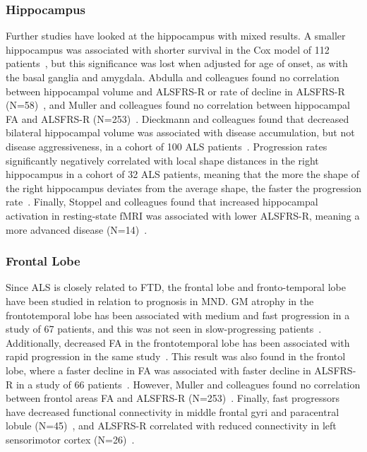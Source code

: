 \subsubsection*{Hippocampus}
Further studies have looked at the hippocampus with mixed results.
A smaller hippocampus was associated with shorter survival in the Cox model of 112 patients~\cite{westenengSubcorticalStructuresAmyotrophic2015}, but this significance was lost when adjusted for age of onset, as with the basal ganglia and amygdala.
Abdulla and colleagues found no correlation between hippocampal volume and ALSFRS-R or rate of decline in ALSFRS-R (N=58)~\cite{abdullaHippocampalDegenerationPatients2014}, and Muller and colleagues found no correlation between hippocampal FA and ALSFRS-R (N=253)~\cite{mullerLargescaleMulticentreCerebral2016}.
Dieckmann and colleagues found that decreased bilateral hippocampal volume was associated with disease accumulation, but not disease aggressiveness, in a cohort of 100 ALS patients~\cite{dieckmannCorticalSubcorticalGrey2022}.
Progression rates significantly negatively correlated with local shape distances in the right hippocampus in a cohort of 32 ALS patients, meaning that the more the shape of the right hippocampus deviates from the average shape, the faster the progression rate~\cite{taeShapeAnalysisSubcortical2020}.
Finally, Stoppel and colleagues found that increased hippocampal activation in resting-state fMRI was associated with lower ALSFRS-R, meaning a more advanced disease (N=14)~\cite{stoppelStructuralFunctionalHallmarks2014}.

\subsubsection*{Frontal Lobe}
Since ALS is closely related to FTD, the frontal lobe and fronto-temporal lobe have been studied in relation to prognosis in MND.
GM atrophy in the frontotemporal lobe has been associated with medium and fast progression in a study of 67 patients, and this was not seen in slow-progressing patients~\cite{sendaStructuralMRICorrelates2017}.
Additionally, decreased FA in the frontotemporal lobe has been associated with rapid progression in the same study~\cite{sendaStructuralMRICorrelates2017}.
This result was also found in the frontol lobe, where a faster decline in FA was associated with faster decline in ALSFRS-R in a study of 66 patients~\cite{kalraProspectiveHarmonizedMulticenter2020}.
However, Muller and colleagues found no correlation between frontol areas FA and ALSFRS-R (N=253)~\cite{mullerLargescaleMulticentreCerebral2016}.
Finally, fast progressors have decreased functional connectivity in middle frontal gyri and paracentral lobule (N=45)~\cite{trojsiRestingStateFunctional2021}, and ALSFRS-R correlated with reduced connectivity in left sensorimotor cortex (N=26)~\cite{agostaSensorimotorFunctionalConnectivity2011}.


